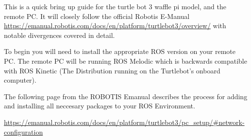 \documentclass{article}
\begin{document}
This is a quick bring up guide for the turtle bot 3 waffle pi model, and the remote PC. It will closely follow the official Robotis E-Manual
\url{https://emanual.robotis.com/docs/en/platform/turtlebot3/overview/} 
with notable  divergences covered in detail.



To begin you will need to install the appropriate ROS version on your remote PC. The remote PC will be running ROS Melodic which is backwards compatible with ROS Kinetic (The Distribution running on the Turtlebot's onboard computer).

The following page from the ROBOTIS Emanual describes the process for adding and installing all neccesary packages to your ROS Environment.

\url {https://emanual.robotis.com/docs/en/platform/turtlebot3/pc_setup/#network-configuration}
\end{document}
